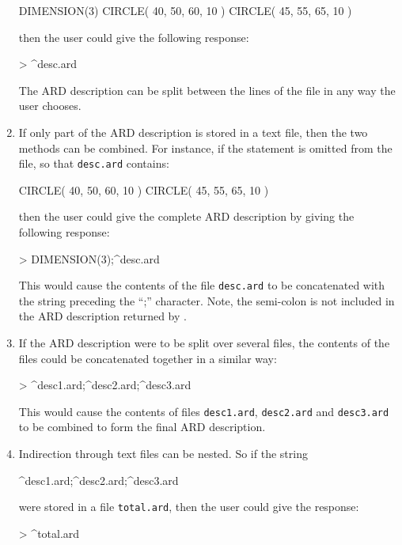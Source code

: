 \documentclass[11pt,nolof]{starlink}
\begin{document}
\begin{enumerate}
\small
\begin{terminalv}
      DIMENSION(3)
      CIRCLE( 40, 50, 60, 10 )
      CIRCLE( 45, 55, 65, 10 )
\end{terminalv}
\normalsize

then the user could give the following response:

\small
\begin{terminalv}
      > ^desc.ard
\end{terminalv}
\normalsize

The ARD description can be split between the lines of the file in any way the
user chooses.

\item If only part of the ARD description is stored in a text file, then the two
methods can be combined. For instance, if the  statement is omitted
from the file, so that \verb+desc.ard+ contains:

\small
\begin{terminalv}
      CIRCLE( 40, 50, 60, 10 )
      CIRCLE( 45, 55, 65, 10 )
\end{terminalv}
\normalsize

then the user could give the complete ARD description by giving the following
response:

\small
\begin{terminalv}
      > DIMENSION(3);^desc.ard
\end{terminalv}
\normalsize

This would cause the contents of the file \verb+desc.ard+ to be concatenated with the
string preceding the ``;'' character. Note, the semi-colon is not included in
the ARD description returned by .

\item If the ARD description were to be split over several files, the contents
of the files could be concatenated together in a similar way:

\small
\begin{terminalv}
      > ^desc1.ard;^desc2.ard;^desc3.ard
\end{terminalv}
\normalsize

This would cause the contents of files \verb+desc1.ard+, \verb+desc2.ard+ and
\verb+desc3.ard+ to be
combined to form the final ARD description.

\item Indirection through text files can be nested. So if the string

\small
\begin{terminalv}
      ^desc1.ard;^desc2.ard;^desc3.ard
\end{terminalv}
\normalsize

were stored in a file \verb+total.ard+, then the user could give the response:

\small
\begin{terminalv}
      > ^total.ard
\end{terminalv}
\normalsize

\end{enumerate}
\end{document}
